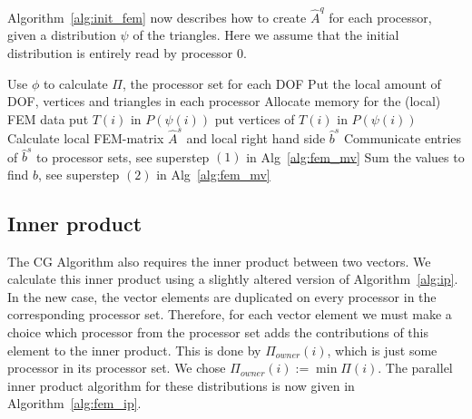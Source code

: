 \documentclass[11pt]{amsart}
\theoremstyle{definition}
\begin{document}
Algorithm~\ref{alg:init_fem} now describes how to create $\hat A^q$ for each processor, given a distribution $\psi$ of the triangles. Here  we assume that the initial distribution is entirely read by processor $0$.


\begin{algorithm}[H]
	 {
		Use $\phi$ to calculate $\Pi$, the processor set for each DOF\; 
		Put the local amount of DOF, vertices and triangles in each processor\;
	}
	Allocate memory for the (local) FEM data\;
	 {
		 {
			put $T(i)$ in $P(\psi(i))$\;
			put vertices of $T(i)$ in $P(\psi(i))$ 
		}
	}
	Calculate local FEM-matrix $\hat A^s$ and local right hand side $\hat b^s$\;
	Communicate entries of $\hat b^s$ to processor sets, see superstep $(1)$ in Alg~\ref{alg:fem_mv}\;
	Sum the values to find $b$, see superstep $(2)$ in Alg~\ref{alg:fem_mv}\;
 \caption{Algorithm that calculates the local FEM data.}
 \label{alg:init_fem}
\end{algorithm}

\subsection{Inner product}
The CG Algorithm also requires the inner product between two vectors. We calculate this inner product using a slightly altered version of Algorithm~\ref{alg:ip}. In the new case, the vector elements are duplicated on every processor in the corresponding processor set. Therefore, for each vector element we must make a choice which processor from the processor set adds the contributions of this element to the inner product. This is done by $\Pi_{owner}(i)$, which is just some processor in its processor set. We chose $\Pi_{owner}(i) := \min \Pi(i)$. The parallel inner product algorithm for these distributions is now given in Algorithm~\ref{alg:fem_ip}.
\end{document}
